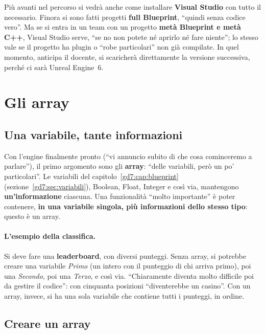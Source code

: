 Più avanti nel percorso si vedrà anche come installare \textbf{Visual Studio}
con tutto il necessario. Finora si sono fatti progetti \textbf{full Blueprint},
``quindi senza codice vero''. Ma se si entra in un team con un progetto
\textbf{metà Blueprint e metà C++}, Visual Studio serve, ``se no non potete né
aprirlo né fare niente''; lo stesso vale se il progetto ha plugin o ``robe
particolari'' non già compilate. In quel momento, anticipa il docente, si
scaricherà direttamente la versione successiva, perché ci sarà Unreal Engine~6.

\section{Gli array}
\label{gd12:sec:array}

\subsection{Una variabile, tante informazioni}

Con l'engine finalmente pronto (``vi annuncio subito di che cosa cominceremo a
parlare''), il primo argomento sono gli \textbf{array}: ``delle variabili, però
un po' particolari''. Le variabili del capitolo~\ref{gd7:cap:blueprint}
(sezione~\ref{gd7:sec:variabili}), Boolean, Float, Integer e così via,
mantengono \textbf{un'informazione} ciascuna. Una funzionalità ``molto
importante'' è poter contenere, \textbf{in una variabile singola, più
informazioni dello stesso tipo}: questo è un array.

\paragraph{L'esempio della classifica.} Si deve fare una \textbf{leaderboard},
con diversi punteggi. Senza array, si potrebbe creare una variabile
\emph{Primo} (un intero con il punteggio di chi arriva primo), poi una
\emph{Secondo}, poi una \emph{Terzo}, e così via. ``Chiaramente diventa molto
difficile poi da gestire il codice'': con cinquanta posizioni ``diventerebbe un
casino''. Con un array, invece, si ha una sola variabile che contiene tutti i
punteggi, in ordine.

\subsection{Creare un array}

